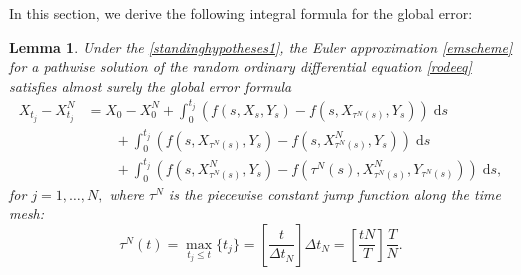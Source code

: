 \documentclass[reqno,12pt]{amsart}
\theoremstyle{plain} %
\newtheorem{lemma}{Lemma}[section]
\theoremstyle{definition} %
\begin{document}
In this section, we derive the following integral formula for the global error:
\begin{lemma}
    \label{lemglobalerrorintegralformula}
    Under the \cref{standinghypotheses1}, the Euler approximation \eqref{emscheme} for a pathwise solution of the random ordinary differential equation \eqref{rodeeq} satisfies almost surely the global error formula
    \begin{equation}
        \label{globalerrorintegralformula}
        \begin{aligned}
            X_{t_j} - X_{t_j}^N & = X_0 - X_0^N + \int_0^{t_j} \left( f(s, X_s, Y_s) - f(s, X_{\tau^N(s)}, Y_s) \right)\;\mathrm{d}s  \\ 
            & \qquad + \int_{0}^{t_j} \left( f(s, X_{\tau^N(s)}, Y_s) - f(s, X_{\tau^N(s)}^N, Y_s) \right)\;\mathrm{d}s \\
            & \qquad + \int_0^{t_j} \left( f(s, X_{\tau^N(s)}^N, Y_s) - f(\tau^N(s), X_{\tau^N(s)}^N, Y_{\tau^N(s)}) \right)\;\mathrm{d}s,
        \end{aligned}
    \end{equation}
    for $j = 1, \ldots, N,$ where $\tau^N$ is the piecewise constant jump function along the time mesh:
    \begin{equation}
        \label{tauNt}
        \tau^N(t) = \max_{t_j \leq t}\{t_j\} = \left[\frac{t}{\Delta t_N}\right]\Delta t_N = \left[\frac{tN}{T}\right]\frac{T}{N}.
    \end{equation}
\end{lemma}
\end{document}
